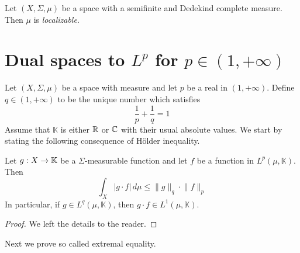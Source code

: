 \begin{definition}
  Let $(X,\Sigma,\mu)$ be a space with a semifinite and Dedekind complete measure. Then $\mu$ is \textit{localizable}.
\end{definition}

\section{Dual spaces to $L^p$ for $p \in (1,+\infty)$}
\noindent
Let $(X,\Sigma,\mu)$ be a space with measure and let $p$ be a real in $(1,+\infty)$. Define $q \in (1,+\infty)$ to be the unique number which satisfies
$$\frac{1}{p} + \frac{1}{q} = 1$$
Assume that $\mathbb{K}$ is either ${\mathbb R}$ or ${\mathbb C}$ with their usual absolute values. We start by stating the following consequence of H{\"o}lder inequality.

\begin{proposition}\label{proposition:consequences_of_Holder_inequality}
  Let $g:X \rightarrow \mathbb{K}$ be a $\Sigma$-measurable function and let $f$ be a function in $L^p(\mu,\mathbb{K})$. Then 
  $$\int_X |g\cdot f|\,d\mu \leq \lVert g\rVert_q \cdot \lVert f\rVert_p$$
  In particular, if $g \in L^q(\mu,\mathbb{K})$, then $g\cdot f \in L^1(\mu,\mathbb{K})$.
\end{proposition}
\begin{proof}
  We left the details to the reader.
\end{proof}
\noindent
Next we prove so called extremal equality.

